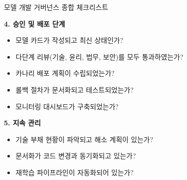 \begin{practicaltool}{모델 개발 거버넌스 종합 체크리스트}
\begin{tcolorbox}[colback=white, colframe=black!75!white, title=모델 개발 거버넌스 체크리스트]
\textbf{4. 승인 및 배포 단계}
\begin{itemize}
  \item[$\square$] 모델 카드가 작성되고 최신 상태인가?\cite{mitchell2019model}
  \item[$\square$] 다단계 리뷰(기술, 윤리, 법무, 보안)를 모두 통과하였는가?
  \item[$\square$] 카나리 배포 계획이 수립되었는가?
  \item[$\square$] 롤백 절차가 문서화되고 테스트되었는가?
  \item[$\square$] 모니터링 대시보드가 구축되었는가?
\end{itemize}

\textbf{5. 지속 관리}
\begin{itemize}
  \item[$\square$] 기술 부채 현황이 파악되고 해소 계획이 있는가?\cite{sculley2015hidden}
  \item[$\square$] 문서화가 코드 변경과 동기화되고 있는가?
  \item[$\square$] 재학습 파이프라인이 자동화되어 있는가?
\end{itemize}
\end{tcolorbox}
\end{practicaltool}

